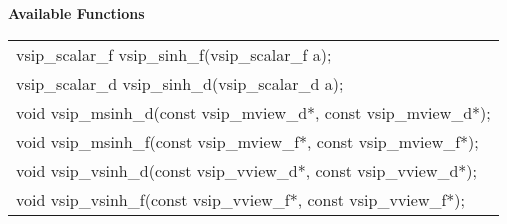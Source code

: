 \\\cvsiplh
\\ \hspace*{.8cm} \vspace*{.1cm} \textbf{Available Functions }
\\ \hspace*{1.1cm} {
\ttfamily
\begin{tabular}[H]{l}
vsip\_scalar\_f vsip\_sinh\_f(vsip\_scalar\_f a);\\
vsip\_scalar\_d vsip\_sinh\_d(vsip\_scalar\_d a);\\
void vsip\_msinh\_d(const vsip\_mview\_d*, const vsip\_mview\_d*);\\
void vsip\_msinh\_f(const vsip\_mview\_f*, const vsip\_mview\_f*);\\
void vsip\_vsinh\_d(const vsip\_vview\_d*, const vsip\_vview\_d*);\\
void vsip\_vsinh\_f(const vsip\_vview\_f*, const vsip\_vview\_f*);\\
\end{tabular}
}
\\\pyjvsiph
{}

